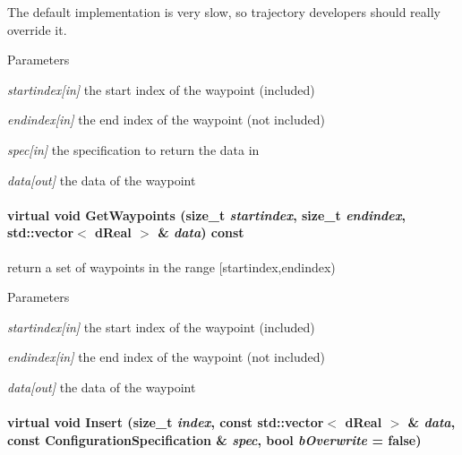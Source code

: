 The default implementation is very slow, so trajectory developers should really override it. 
\begin{DoxyParams}{Parameters}
\item[{\em startindex\mbox{[}in\mbox{]}}]the start index of the waypoint (included) \item[{\em endindex\mbox{[}in\mbox{]}}]the end index of the waypoint (not included) \item[{\em spec\mbox{[}in\mbox{]}}]the specification to return the data in \item[{\em data\mbox{[}out\mbox{]}}]the data of the waypoint \end{DoxyParams}
\hypertarget{classOpenRAVE_1_1TrajectoryBase_a27ce506aadd014e6c7e960daf5840e92}{
\paragraph[{GetWaypoints}]{\setlength{\rightskip}{0pt plus 5cm}virtual void GetWaypoints (size\_\-t {\em startindex}, \/  size\_\-t {\em endindex}, \/  std::vector$<$ dReal $>$ \& {\em data}) const}\hfill}
\label{classOpenRAVE_1_1TrajectoryBase_a27ce506aadd014e6c7e960daf5840e92}


return a set of waypoints in the range \mbox{[}startindex,endindex) 


\begin{DoxyParams}{Parameters}
\item[{\em startindex\mbox{[}in\mbox{]}}]the start index of the waypoint (included) \item[{\em endindex\mbox{[}in\mbox{]}}]the end index of the waypoint (not included) \item[{\em data\mbox{[}out\mbox{]}}]the data of the waypoint \end{DoxyParams}
\hypertarget{classOpenRAVE_1_1TrajectoryBase_a1adb5dcb120bbec5da9e326a84d61fb9}{
\paragraph[{Insert}]{\setlength{\rightskip}{0pt plus 5cm}virtual void Insert (size\_\-t {\em index}, \/  const std::vector$<$ dReal $>$ \& {\em data}, \/  const {\bf ConfigurationSpecification} \& {\em spec}, \/  bool {\em bOverwrite} = {\ttfamily false})}\hfill}
\label{classOpenRAVE_1_1TrajectoryBase_a1adb5dcb120bbec5da9e326a84d61fb9}


